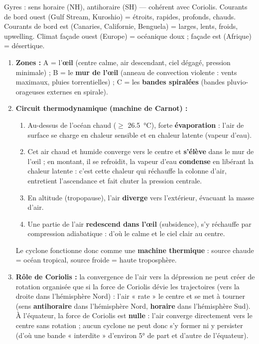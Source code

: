 \documentclass[11pt]{article}
\begin{document}
\begin{attention}
Gyres : sens horaire (NH), antihoraire (SH) — cohérent avec Coriolis. Courants de bord ouest (Gulf Stream, Kuroshio) = étroits, rapides, profonds, chauds. Courants de bord est (Canaries, Californie, Benguela) = larges, lents, froids, upwelling. Climat façade ouest (Europe) = océanique doux ; façade est (Afrique) = désertique.
\end{attention}

\begin{corrige}
\begin{enumerate}
    \item \textbf{Zones :} A = l'\textbf{œil} (centre calme, air descendant, ciel dégagé, pression minimale) ; B = le \textbf{mur de l'œil} (anneau de convection violente : vents maximaux, pluies torrentielles) ; C = les \textbf{bandes spiralées} (bandes pluvio-orageuses externes en spirale).
    \item \textbf{Circuit thermodynamique (machine de Carnot) :}
    \begin{enumerate}
        \item Au-dessus de l'océan chaud ($\geq$ \SI{26,5}{\celsius}), forte \textbf{évaporation} : l'air de surface se charge en chaleur sensible et en chaleur latente (vapeur d'eau).
        \item Cet air chaud et humide converge vers le centre et \textbf{s'élève} dans le mur de l'œil ; en montant, il se refroidit, la vapeur d'eau \textbf{condense} en libérant la chaleur latente : c'est cette chaleur qui réchauffe la colonne d'air, entretient l'ascendance et fait chuter la pression centrale.
        \item En altitude (tropopause), l'air \textbf{diverge} vers l'extérieur, évacuant la masse d'air.
        \item Une partie de l'air \textbf{redescend dans l'œil} (subsidence), s'y réchauffe par compression adiabatique : d'où le calme et le ciel clair au centre.
    \end{enumerate}
    Le cyclone fonctionne donc comme une \textbf{machine thermique} : source chaude = océan tropical, source froide = haute troposphère.
    \item \textbf{Rôle de Coriolis :} la convergence de l'air vers la dépression ne peut créer de rotation organisée que si la force de Coriolis dévie les trajectoires (vers la droite dans l'hémisphère Nord) : l'air « rate » le centre et se met à tourner (sens \textbf{antihoraire} dans l'hémisphère Nord, \textbf{horaire} dans l'hémisphère Sud). À l'équateur, la force de Coriolis est \textbf{nulle} : l'air converge directement vers le centre sans rotation ; aucun cyclone ne peut donc s'y former ni y persister (d'où une bande « interdite » d'environ 5° de part et d'autre de l'équateur).

\end{enumerate}
\end{corrige}
\end{document}
